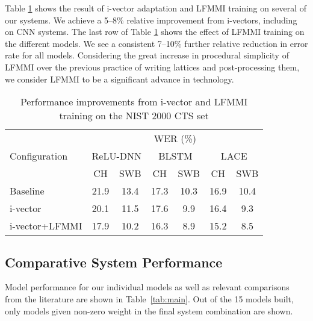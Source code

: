 \documentclass{article}
\begin{document}
Table \ref{tab:lfmmi} shows the result of i-vector adaptation and LFMMI training
on several
of our systems. We achieve a 5--8\% relative improvement from i-vectors, including on
CNN systems. 
The last row of Table \ref{tab:lfmmi} shows the effect of LFMMI training on the 
different models. We see a consistent 7--10\% further 
relative reduction in error
rate for all models. Considering the great increase in procedural simplicity of
LFMMI over the previous practice of writing lattices and post-processing them,
we consider LFMMI to be a significant advance in technology.















\begin{table}[tbh]
    \centering
\caption{Performance improvements from i-vector and LFMMI training on the NIST 2000 CTS set}
\label{tab:lfmmi}
	\small
    \begin{tabular}{|l|c|c|c|c|c|c|}
    \hline 
	\multirow{3}{*}{Configuration} & \multicolumn{6}{c|}{WER (\%)}                                  \\ \cline{2-7}
                               & \multicolumn{2}{c|}{ReLU-DNN} & \multicolumn{2}{c|}{BLSTM} & \multicolumn{2}{c|}{LACE}\\ \cline{2-7}
                               	& CH 	& SWB	& CH   	& SWB  	& CH  	& SWB 	\\ \hline
	Baseline          	& 21.9 	& 13.4	& 17.3 	&  10.3	& 16.9 	& 10.4  	\\ \hline
	i-vector         	& 20.1	& 11.5	& 17.6	&  9.9  & 16.4 	& 9.3     \\ \hline
	i-vector+LFMMI    	& 17.9	& 10.2	& 16.3	&  8.9	& 15.2	& 8.5		\\ \hline           
    	\end{tabular}

\end{table}

\vspace*{-0.1in}
\subsection{Comparative System Performance}

Model performance for our individual models as well as relevant comparisons from
the literature are shown in Table~\ref{tab:main}. 
Out of the 15 models built, only models given non-zero 
weight in the final system combination are shown.
\end{document}
